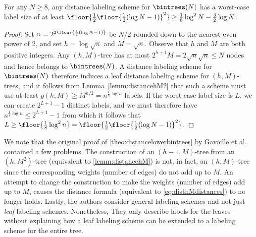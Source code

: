 \begin{theorem} \label{theo:distancelowerbintrees}
For any $N\geq 8$, any distance labeling scheme for $\bintrees(N)$ has a worst-case label size of at least $\floor{\frac{1}{2}\floor{\frac{1}{2}(\log N-1)}^2}\geq\frac{1}{8}\log^2 N - \frac{3}{2}\log N$.
\end{theorem}
\begin{proof}
Set $n=2^{2\floor{\frac{1}{2}(\log N-1)}}$ be $N/2$ rounded down to the nearest even power of $2$, and set $h=\log \sqrt{n}$ and $M=\sqrt{n}$. Observe that $h$ and $M$ are both positive integers. Any $(h,M)$-tree has at most $2^{h+1} M = 2\sqrt{n}\sqrt{n}\leq N$ nodes and hence belongs to $\bintrees(N)$. A distance labeling scheme for $\bintrees(N)$ therefore induces a leaf distance labeling scheme for $(h,M)$-trees, and it follows from Lemma~\ref{lemm:distancehM2} that such a scheme must use at least $g(h,M)\geq M^{h/2}=n^{\frac{1}{8}\log n}$ labels. If the worst-case label size is $L$, we can create $2^{L+1}-1$ distinct labels, and we must therefore have $n^{\frac{1}{8}\log n}\leq 2^{L+1}-1$ from which it follows that $L\geq  \floor{\frac{1}{8}\log^2 n} = \floor{\frac{1}{2}\floor{\frac{1}{2}(\log N-1)}^2}$.
\end{proof}

We note that  the original proof of \ref{theo:distancelowerbintrees} by Gavoille et al.~\cite{gavoillea2004distance} contained a few problems. 
The construction of an $(h-1,M)$-tree from an $(h,M^2)$-tree (equivalent to \ref{lemm:distancehM}) is not, in fact, an $(h,M)$-tree since the corresponding weights (number of edges) do not add up to $M$.
An attempt to change  the  construction to make the weights (number of edges) add up to $M$, causes the  distance formula (equivalent to  \eqref{eq:disthMdistances}) to no longer holds.
Lastly,  the authors consider general labeling schemes and not just \emph{leaf} labeling schemes.
 Nonetheless, They only describe labels for the leaves without explaining how a leaf labeling scheme can be extended to a labeling scheme for the entire tree.


